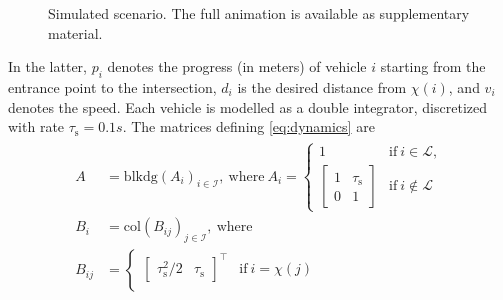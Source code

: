 \documentclass[letterpaper, 10 pt, conference]{ieeeconf}  %
\newcommand{\mc}{\mathcal}
\newcommand{\col}{\mathrm{col}}
\newcommand{\blkdiag}{\mathrm{blkdg}}
\begin{document}
{\begin{figure}
    \caption{Simulated scenario. The full animation is available as supplementary material.}
    \label{fig:frame_simulation}
\end{figure}
In the latter, $p_i$ denotes the progress (in meters) of vehicle $i$ starting from the entrance point to the intersection, $d_i$ is the desired distance from $\chi(i)$, and $v_i$ denotes the speed. Each vehicle is modelled as a double integrator, discretized with rate $\tau_\text{s}=0.1s$. The matrices defining \eqref{eq:dynamics} are
\begin{align}
    \begin{split}
        A &= \blkdiag(A_i)_{i\in\mc I}, ~\text{where}~ A_i = \begin{cases}
            1 & \text{if} ~i\in\mc L, \\
            \begin{bmatrix}
                1 & \tau_{\text{s}} \\ 0 &1 
            \end{bmatrix} &\text{if} ~i\notin\mc L
        \end{cases} \\
        B_i &= \col(B_{ij})_{j\in\mc I}, ~\text{where}  \\
        B_{ij} &= \begin{cases}
            \begin{bmatrix}
            \tau_\text{s}^2/2 & \tau_\text{s} 
        \end{bmatrix}^\top &\text{if}~ i=\chi(j)\\

\end{cases}
\end{split}
\end{align}}
\end{document}
